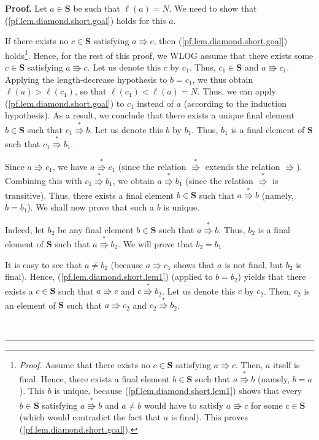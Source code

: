 \documentclass[numbers=enddot,12pt,final,onecolumn,notitlepage]{scrartcl}%
\theoremstyle{definition}
\newenvironment{proof}[1][Proof]{\noindent\textbf{#1.} }{\ \rule{0.5em}{0.5em}}
\newenvironment{vershort}{}{}
\begin{document}
\begin{vershort}
\begin{proof}
Let $a\in\mathbf{S}$ be such that $\ell\left(  a\right)  =N$. We need to show
that (\ref{pf.lem.diamond.short.goal}) holds for this $a$.

If there exists no $c\in\mathbf{S}$ satisfying $a\Rrightarrow c$, then
(\ref{pf.lem.diamond.short.goal}) holds\footnote{\textit{Proof.} Assume that
there exists no $c\in\mathbf{S}$ satisfying $a\Rrightarrow c$. Then, $a$
itself is final. Hence, there exists a final element $b\in\mathbf{S}$ such
that $a\overset{\ast}{\Rrightarrow}b$ (namely, $b=a$). This $b$ is unique,
because (\ref{pf.lem.diamond.short.lem1}) shows that every $b\in\mathbf{S}$
satisfying $a\overset{\ast}{\Rrightarrow}b$ and $a\neq b$ would have to
satisfy $a\Rrightarrow c$ for some $c \in \mathbf{S}$ (which would
contradict the fact that $a$ is final). This proves
(\ref{pf.lem.diamond.short.goal}).}.
Hence, for the rest of this proof, we WLOG assume that there exists some
$c\in\mathbf{S}$ satisfying $a\Rrightarrow c$. Let us denote this $c$ by
$c_{1}$. Thus, $c_{1}\in\mathbf{S}$ and\textbf{ }$a\Rrightarrow c_{1}$.
Applying the length-decrease hypothesis to $b=c_{1}$, we thus obtain
$\ell\left(  a\right)  >\ell\left(  c_{1}\right)  $, so that $\ell\left(
c_{1}\right)  <\ell\left(  a\right)  =N$. Thus, we can apply
(\ref{pf.lem.diamond.short.goal}) to $c_{1}$ instead of $a$ (according to the
induction hypothesis). As a result, we conclude that there exists a unique
final element $b\in\mathbf{S}$ such that $c_{1}\overset{\ast}{\Rrightarrow}b$.
Let us denote this $b$ by $b_{1}$. Thus, $b_{1}$ is a final element of
$\mathbf{S}$ such that $c_{1}\overset{\ast}{\Rrightarrow}b_{1}$.

Since $a\Rrightarrow c_{1}$, we have $a\overset{\ast}{\Rrightarrow}c_{1}$
(since the relation $\overset{\ast}{\Rrightarrow}$ extends the relation
$\Rrightarrow$). Combining this with $c_{1}\overset{\ast}{\Rrightarrow}b_{1}$,
we obtain $a\overset{\ast}{\Rrightarrow}b_{1}$ (since the relation
$\overset{\ast}{\Rrightarrow}$ is transitive). Thus, there exists a final
element $b\in\mathbf{S}$ such that $a\overset{\ast}{\Rrightarrow}b$ (namely,
$b=b_{1}$). We shall now prove that such a $b$ is unique.

Indeed, let $b_{2}$ be any final element $b\in\mathbf{S}$ such that
$a\overset{\ast}{\Rrightarrow}b$. Thus, $b_{2}$ is a final element of
$\mathbf{S}$ such that $a\overset{\ast}{\Rrightarrow}b_{2}$. We will prove
that $b_{2}=b_{1}$.

It is easy to see that $a\neq b_{2}$ (because $a\Rrightarrow c_{1}$ shows that
$a$ is not final, but $b_{2}$ is final). Hence,
(\ref{pf.lem.diamond.short.lem1}) (applied to $b=b_{2}$) yields that there
exists a $c\in\mathbf{S}$ such that $a\Rrightarrow c$ and $c\overset{\ast
}{\Rrightarrow}b_{2}$. Let us denote this $c$ by $c_{2}$. Then, $c_{2}$ is an
element of $\mathbf{S}$ such that $a\Rrightarrow c_{2}$ and $c_{2}%
\overset{\ast}{\Rrightarrow}b_{2}$.


\end{proof}
\end{vershort}
\end{document}
